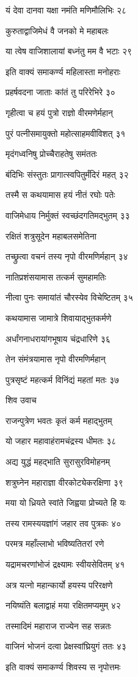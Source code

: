 यं देवा दानवा यक्षा नमंति मणिमौलिभिः २८

कुरुताद्वाजिमेधं वै जनको मे महाबलः

या त्वेष वाजिशालायां बध्नंतु मम वै भटाः २९

इति वाक्यं समाकर्ण्य महिलास्ता मनोहराः

प्रहर्षवदना जाताः कांतं तु परिरेभिरे ३०

गृहीत्वा च हयं पुत्रो राज्ञो वीरमणेर्महान्

पुरं पत्नीसमायुक्तो महोत्साहमवीविशत् ३१

मृदंगध्वनिषु प्रोच्चैराहतेषु समंततः

बंदिभिः संस्तुतः प्रागात्स्वपितुर्मंदिरं महत् ३२

तस्मै स कथयामास हयं नीतं रघोः पतेः

वाजिमेधाय निर्मुक्तं स्वच्छंदगतिमद्भुतम् ३३

रक्षितं शत्रुसूदेन महाबलसमेतिना

तच्छ्रुत्वा वचनं तस्य नृपो वीरमणिर्महान् ३४

नातिप्रशंसयामास तत्कर्म सुमहामतिः

नीत्वा पुनः समायांतं चौरस्येव विचेष्टितम् ३५

कथयामास जामात्रे शिवायाद्भुतकर्मणे

अर्धांगनाधरायांगभूषाय चंद्रधारिणे ३६

तेन संमंत्रयामास नृपो वीरमणिर्महान्

पुत्रसृष्टं महत्कर्म विनिंद्यं महतां मतः ३७

शिव उवाच

राजन्पुत्रेण भवतः कृतं कर्म महाद्भुतम्

यो जहार महावाहंरामचंद्रस्य धीमतः ३८

अद्य युद्धं महद्भाति सुरासुरविमोहनम्

शत्रुघ्नेन महाराज्ञा वीरकोट्येकरक्षिणा ३९

मया यो ध्रियते स्वांते जिह्वया प्रोच्यते हि यः

तस्य रामस्ययज्ञांगं जहार तव पुत्रकः ४०

परमत्र महाँल्लाभो भविष्यतितरां रणे

यद्रामचरणांभोजं द्रक्ष्यामः स्वीयसेवितम् ४१

अत्र यत्नो महान्कार्यो हयस्य परिरक्षणे

नयिष्यंति बलाद्वाहं मया रक्षितमप्यमुम् ४२

तस्मादिमं महाराज राज्येन सह सन्नतः

वाजिनं भोजनं दत्वा प्रेक्षस्वांघ्रियुगं ततः ४३

इति वाक्यं समाकर्ण्य शिवस्य स नृपोत्तमः

